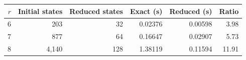 \begin{tabular}{rrrrrr}\toprule
$r$ & Initial states & Reduced states & Exact (s) & Reduced (s) & Ratio\\\midrule
6 & 203 & 32 & 0.02376 & 0.00598 & 3.98\\
7 & 877 & 64 & 0.16647 & 0.02907 & 5.73\\
8 & 4,140 & 128 & 1.38119 & 0.11594 & 11.91\\
\bottomrule\end{tabular}
